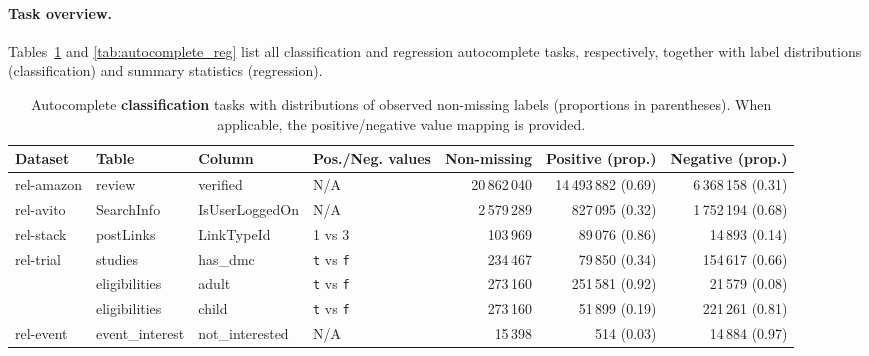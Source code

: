 \paragraph{Task overview.}
Tables~\ref{tab:autocomplete_clf} and \ref{tab:autocomplete_reg} list all classification and regression autocomplete tasks, respectively, together with label distributions (classification) and summary statistics (regression).
\begin{table}[t]
\centering
\scriptsize
\begin{tabular}{llllrrr}
\toprule
Dataset & Table & Column & Pos./Neg. values & Non-missing & Positive (prop.) & Negative (prop.) \\
\midrule
\multirow{1}{*}{rel-amazon}
  & review & verified & N/A & 20\,862\,040 & 14\,493\,882 (0.69) & 6\,368\,158 (0.31) \\
\cmidrule(lr){1-7}
\multirow{1}{*}{rel-avito}
  & SearchInfo & IsUserLoggedOn & N/A & 2\,579\,289 & 827\,095 (0.32) & 1\,752\,194 (0.68) \\
\cmidrule(lr){1-7}
\multirow{1}{*}{rel-stack}
  & postLinks & LinkTypeId & 1 vs 3 & 103\,969 & 89\,076 (0.86) & 14\,893 (0.14) \\
\cmidrule(lr){1-7}
\multirow{3}{*}{rel-trial}
  & studies       & has\_dmc & \texttt{t} vs \texttt{f} & 234\,467 & 79\,850 (0.34) & 154\,617 (0.66) \\
\cmidrule(lr){2-7}
  & eligibilities & adult   & \texttt{t} vs \texttt{f} & 273\,160 & 251\,581 (0.92) & 21\,579 (0.08) \\
\cmidrule(lr){2-7}
  & eligibilities & child   & \texttt{t} vs \texttt{f} & 273\,160 & 51\,899 (0.19)  & 221\,261 (0.81) \\
\cmidrule(lr){1-7}
\multirow{1}{*}{rel-event}
  & event\_interest & not\_interested & N/A & 15\,398 & 514 (0.03) & 14\,884 (0.97) \\
\bottomrule
\end{tabular}
\caption{Autocomplete \textbf{classification} tasks with distributions of observed non-missing labels (proportions in parentheses). When applicable, the positive/negative value mapping is provided.}
\label{tab:autocomplete_clf}
\end{table}

